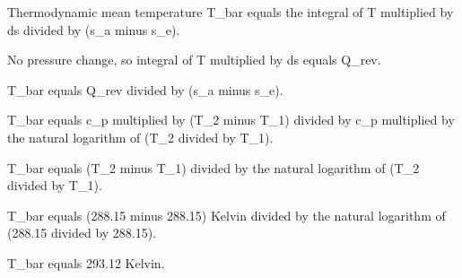 Thermodynamic mean temperature T_bar equals the integral of T multiplied by ds divided by (s_a minus s_e).  

No pressure change, so integral of T multiplied by ds equals Q_rev.  

T_bar equals Q_rev divided by (s_a minus s_e).  

T_bar equals c_p multiplied by (T_2 minus T_1) divided by c_p multiplied by the natural logarithm of (T_2 divided by T_1).  

T_bar equals (T_2 minus T_1) divided by the natural logarithm of (T_2 divided by T_1).  

T_bar equals (288.15 minus 288.15) Kelvin divided by the natural logarithm of (288.15 divided by 288.15).  

T_bar equals 293.12 Kelvin.